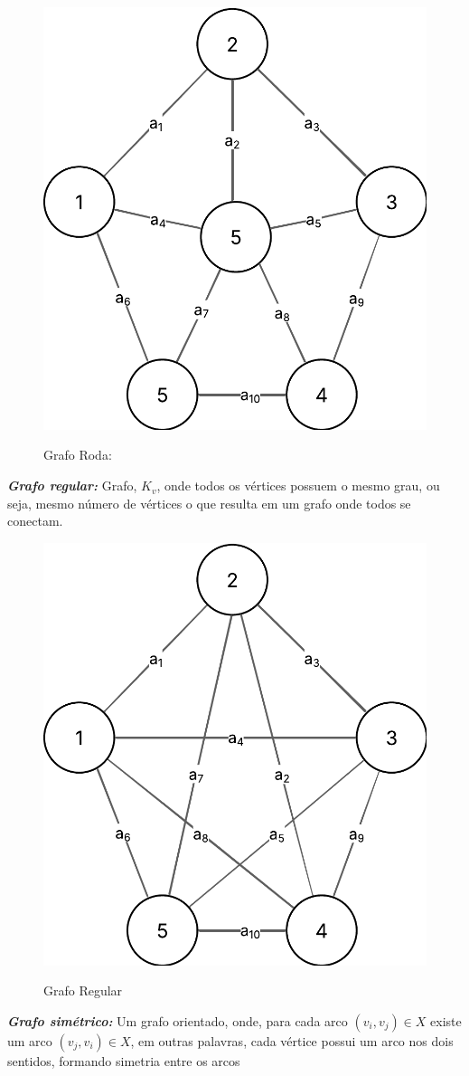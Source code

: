 \begin{figure} [H]
	\centering
	\caption{Grafo Roda:}%
	\label{fig:grafRoda}%
	\includegraphics[width=0.5\linewidth,angle=0]{figuras/tiposgrafos/grafRoda.png}%
	\\
\end{figure}
\textit{\textbf{Grafo regular:}} Grafo, $ K_v $, onde todos os vértices possuem o mesmo grau, ou seja, mesmo número de vértices o que resulta em um grafo onde todos se conectam. \\
\begin{figure} [H]
	\centering
	\caption{Grafo Regular}%
	\label{fig:grafRegular}%
	\includegraphics[width=0.5\linewidth,angle=0]{figuras/tiposgrafos/grafRegular.png}%
	\\
\end{figure}
\textit{\textbf{Grafo simétrico:}} Um grafo orientado, onde, para cada arco $ (v_i, v_j) \in X$ existe um arco $ (v_j,v_i)\in X $, em outras palavras, cada vértice possui um arco nos dois sentidos, formando simetria entre os arcos  \\
